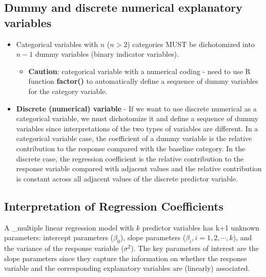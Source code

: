 \documentclass[
]{book}
\providecommand{\tightlist}{%
  \setlength{\itemsep}{0pt}\setlength{\parskip}{0pt}}
\begin{document}
\hypertarget{dummy-and-discrete-numerical-explanatory-variables}{%
\subsection{Dummy and discrete numerical explanatory variables}\label{dummy-and-discrete-numerical-explanatory-variables}}

\begin{itemize}
\tightlist
\item
  Categorical variables with \(n\) (\(n > 2\)) categories MUST be dichotomized into \(n-1\) dummy variables (binary indicator variables).

  \begin{itemize}
  \tightlist
  \item
    \textbf{Caution}: categorical variable with a numerical coding - need to use R function \textbf{factor()} to automatically define a sequence of dummy variables for the category variable.
  \end{itemize}
\item
  \textbf{Discrete (numerical) variable} - If we want to use discrete numerical as a categorical variable, we must dichotomize it and define a sequence of dummy variables since interpretations of the two types of variables are different. In a categorical variable case, the coefficient of a dummy variable is the relative contribution to the response compared with the baseline category. In the discrete case, the regression coefficient is the relative contribution to the response variable compared with adjacent values and the relative contribution is constant across all adjacent values of the discrete predictor variable.
\end{itemize}

\hypertarget{interpretation-of-regression-coefficients-1}{%
\subsection{Interpretation of Regression Coefficients}\label{interpretation-of-regression-coefficients-1}}

A \_multiple linear regression model with \(k\) predictor variables has k+1 unknown parameters: intercept parameters (\(\beta_0\)), slope parameters (\(\beta_i, i = 1, 2, \cdots, k\)), and the variance of the response variable (\(\sigma^2\)). The key parameters of interest are the slope parameters since they capture the information on whether the response variable and the corresponding explanatory variables are (linearly) associated.
\end{document}
